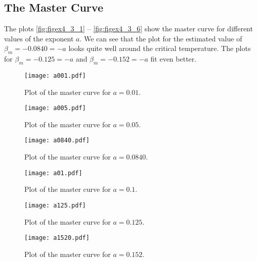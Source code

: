 \documentclass[a4paper,10pt,bibtotoc]{scrartcl}
\begin{document}
\newpage
\subsection{The Master Curve}
The plots \autoref{fig:figex4_3_1} -- \autoref{fig:figex4_3_6} show the master curve for different values of the exponent $a$.
We can see that the plot for the estimated value of $\beta_m=-0.0840=-a$ looks quite well around the critical temperature. 
The plots for $\beta_m=-0.125=-a$ and $\beta_m=-0.152=-a$ fit even better.

\begin{figure}[H]
	\centering
	\texttt{[image: a001.pdf]}
	\caption{Plot of the master curve for $a=0.01$.}
	\label{fig:figex4_3_1}
\end{figure}

\begin{figure}[H]
	\centering
	\texttt{[image: a005.pdf]}
	\caption{Plot of the master curve for $a=0.05$.}
	\label{fig:figex4_3_2}
\end{figure}

\begin{figure}[H]
	\centering
	\texttt{[image: a0840.pdf]}
	\caption{Plot of the master curve for $a=0.0840$.}
	\label{fig:figex4_3_3}
\end{figure}

\begin{figure}[H]
	\centering
	\texttt{[image: a01.pdf]}
	\caption{Plot of the master curve for $a=0.1$.}
	\label{fig:figex4_3_4}
\end{figure}

\begin{figure}[H]
	\centering
	\texttt{[image: a125.pdf]}
	\caption{Plot of the master curve for $a=0.125$.}
	\label{fig:figex4_3_5}
\end{figure}

\begin{figure}[H]
	\centering
	\texttt{[image: a1520.pdf]}
	\caption{Plot of the master curve for $a=0.152$.}
	\label{fig:figex4_3_6}
\end{figure}



\newpage
\end{document}
